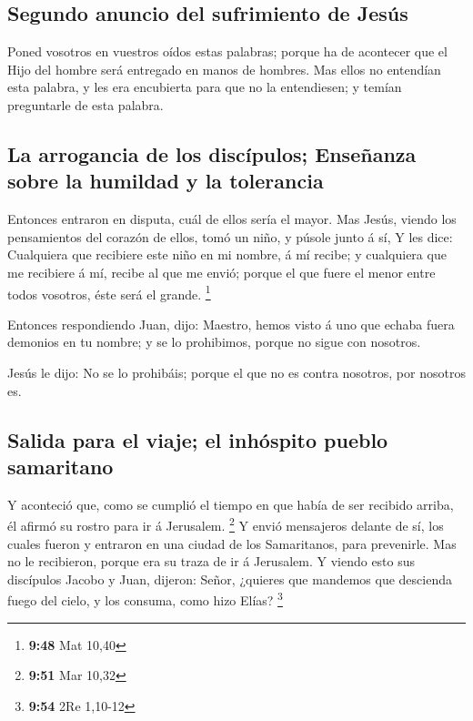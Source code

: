 \hypertarget{segundo-anuncio-del-sufrimiento-de-jesuxfas}{%
\subsection{Segundo anuncio del sufrimiento de
Jesús}\label{segundo-anuncio-del-sufrimiento-de-jesuxfas}}

 Poned vosotros en vuestros oídos estas palabras; porque ha
de acontecer que el Hijo del hombre será entregado en manos de hombres.
 Mas ellos no entendían esta palabra, y les era encubierta
para que no la entendiesen; y temían preguntarle de esta palabra.

\hypertarget{la-arrogancia-de-los-discuxedpulos-enseuxf1anza-sobre-la-humildad-y-la-tolerancia}{%
\subsection{La arrogancia de los discípulos; Enseñanza sobre la humildad
y la
tolerancia}\label{la-arrogancia-de-los-discuxedpulos-enseuxf1anza-sobre-la-humildad-y-la-tolerancia}}

 Entonces entraron en disputa, cuál de ellos sería el
mayor.  Mas Jesús, viendo los pensamientos del corazón de
ellos, tomó un niño, y púsole junto á sí,  Y les dice:
Cualquiera que recibiere este niño en mi nombre, á mí recibe; y
cualquiera que me recibiere á mí, recibe al que me envió; porque el que
fuere el menor entre todos vosotros, éste será el grande. \footnote{\textbf{9:48}
  Mat 10,40}

 Entonces respondiendo Juan, dijo: Maestro, hemos visto á
uno que echaba fuera demonios en tu nombre; y se lo prohibimos, porque
no sigue con nosotros.

 Jesús le dijo: No se lo prohibáis; porque el que no es
contra nosotros, por nosotros es.

\hypertarget{salida-para-el-viaje-el-inhuxf3spito-pueblo-samaritano}{%
\subsection{Salida para el viaje; el inhóspito pueblo
samaritano}\label{salida-para-el-viaje-el-inhuxf3spito-pueblo-samaritano}}

 Y aconteció que, como se cumplió el tiempo en que había de
ser recibido arriba, él afirmó su rostro para ir á Jerusalem.
\footnote{\textbf{9:51} Mar 10,32}  Y envió mensajeros
delante de sí, los cuales fueron y entraron en una ciudad de los
Samaritanos, para prevenirle.  Mas no le recibieron, porque
era su traza de ir á Jerusalem.  Y viendo esto sus
discípulos Jacobo y Juan, dijeron: Señor, ¿quieres que mandemos que
descienda fuego del cielo, y los consuma, como hizo Elías? \footnote{\textbf{9:54}
  2Re 1,10-12}


